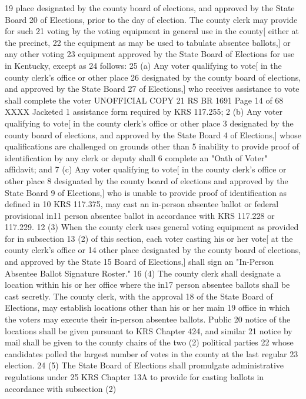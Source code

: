 19 place designated by the county board of elections, and approved by the State Board
20 of Elections, prior to the day of election. The county clerk may provide for such
21 voting by the voting equipment in general use in the county[ either at the precinct,
22 the equipment as may be used to tabulate absentee ballots,] or any other voting
23 equipment approved by the State Board of Elections for use in Kentucky, except as
24 follows:
25 (a) Any voter qualifying to vote[ in the county clerk's office or other place
26 designated by the county board of elections, and approved by the State Board
27 of Elections,] who receives assistance to vote shall complete the voter 
UNOFFICIAL COPY 21 RS BR 1691
Page 14 of 68
XXXX Jacketed
1 assistance form required by KRS 117.255;
2 (b) Any voter qualifying to vote[ in the county clerk's office or other place
3 designated by the county board of elections, and approved by the State Board
4 of Elections,] whose qualifications are challenged on grounds other than
5 inability to provide proof of identification by any clerk or deputy shall
6 complete an "Oath of Voter" affidavit; and
7 (c) Any voter qualifying to vote[ in the county clerk's office or other place
8 designated by the county board of elections and approved by the State Board
9 of Elections,] who is unable to provide proof of identification as defined in
10 KRS 117.375, may cast an in-person absentee ballot or federal provisional in11 person absentee ballot in accordance with KRS 117.228 or 117.229.
12 (3) When the county clerk uses general voting equipment as provided for in subsection
13 (2) of this section, each voter casting his or her vote[ at the county clerk's office or
14 other place designated by the county board of elections, and approved by the State
15 Board of Elections,] shall sign an "In-Person Absentee Ballot Signature Roster."
16 (4) The county clerk shall designate a location within his or her office where the in17 person absentee ballots shall be cast secretly. The county clerk, with the approval
18 of the State Board of Elections, may establish locations other than his or her main
19 office in which the voters may execute their in-person absentee ballots. Public
20 notice of the locations shall be given pursuant to KRS Chapter 424, and similar
21 notice by mail shall be given to the county chairs of the two (2) political parties
22 whose candidates polled the largest number of votes in the county at the last regular
23 election.
24 (5) The State Board of Elections shall promulgate administrative regulations under
25 KRS Chapter 13A to provide for casting ballots in accordance with subsection (2)
